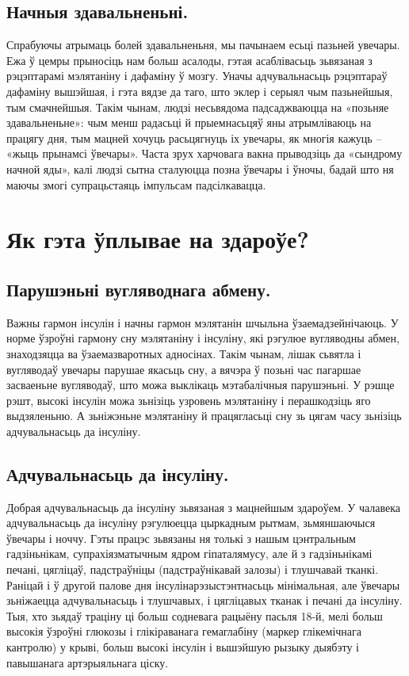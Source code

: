 \subsection{Начныя здавальненьні.}
Спрабуючы атрымаць болей здавальненьня, мы пачынаем есьці пазьней увечары. Ежа ў цемры прыносіць нам больш асалоды, гэтая асаблівасьць зьвязаная з рэцэптарамі мэлятаніну і дафаміну ў мозгу. Уначы адчувальнасьць рэцэптараў дафаміну вышэйшая, і гэта вядзе да таго, што эклер і серыял чым пазьнейшыя, тым смачнейшыя. Такім чынам, людзі несьвядома падсаджваюцца на «позьняе здавальненьне»: чым менш радасьці й прыемнасьцяў яны атрымліваюць на працягу дня, тым мацней хочуць расьцягнуць іх увечары, як многія кажуць – «жыць прынамсі ўвечары». Часта зрух харчовага вакна прыводзіць да «сындрому начной яды», калі людзі сытна сталуюцца позна ўвечары і ўночы, бадай што ня маючы змогі супрацьстаяць імпульсам падсілкавацца.

\section{Як гэта ўплывае на здароўе?}

\subsection{Парушэньні вугляводнага абмену.}
Важны гармон інсулін і начны гармон мэлятанін шчыльна ўзаемадзейнічаюць. У норме ўзроўні гармону сну мэлятаніну і інсуліну, які рэгулюе вугляводны абмен, знаходзяцца ва ўзаемазваротных адносінах. Такім чынам, лішак сьвятла і вугляводаў увечары парушае якасьць сну, а вячэра ў позьні час пагаршае засваеньне вугляводаў, што можа выклікаць мэтабалічныя парушэньні. У рэшце рэшт, высокі інсулін можа зьнізіць узровень мэлятаніну і перашкодзіць яго выдзяленьню. А зьніжэньне мэлятаніну й працягласьці сну зь цягам часу зьнізіць адчувальнасьць да інсуліну.

\subsection{Адчувальнасьць да інсуліну.}
Добрая адчувальнасьць да інсуліну зьвязаная з мацнейшым здароўем. У чалавека адчувальнасьць да інсуліну рэгулюецца цыркадным рытмам, зьмяншаючыся ўвечары і ноччу. Гэты працэс зьвязаны ня толькі з нашым цэнтральным гадзіньнікам, супрахіязматычным ядром гіпаталямусу, але й з гадзіньнікамі печані, цягліцаў, падстраўніцы (падстраўнікавай залозы) і тлушчавай тканкі. Раніцай і ў другой палове дня інсулінарэзыстэнтнасьць мінімальная, але ўвечары зьніжаецца адчувальнасьць і тлушчавых, і цягліцавых тканак і печані да інсуліну. Тыя, хто зьядаў траціну ці больш содневага рацыёну пасьля 18-й, мелі больш высокія ўзроўні глюкозы і глікіраванага гемаглабіну (маркер глікемічнага кантролю) у крыві, больш высокі інсулін і вышэйшую рызыку дыябэту і павышанага артэрыяльнага ціску.

